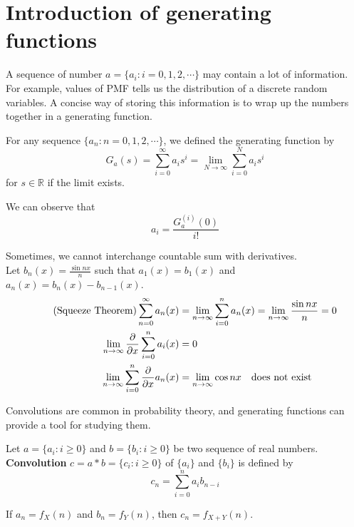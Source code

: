 \documentclass{huhtakm-template-book}
\begin{document}
\section{Introduction of generating functions}
A sequence of number $a=\{a_{i}:i=0,1,2,\cdots\}$ may contain a lot of information. For example, values of PMF tells us the distribution of a discrete random variables. A concise way of storing this information is to wrap up the numbers together in a generating function. 
\begin{defn}
	For any sequence $\{a_{n}:n=0,1,2,\cdots\}$, we defined the generating function by
	\begin{equation*}
		G_{a}(s)=\sum_{i=0}^{\infty}a_{i}s^{i}=\lim_{N\to\infty}\sum_{i=0}^{N}a_{i}s^{i}
	\end{equation*}
	for $s\in\mathbb{R}$ if the limit exists. 
\end{defn}
\begin{rem}
	We can observe that
	\begin{equation*}
		a_{i}=\frac{G_{a}^{(i)}(0)}{i!}
	\end{equation*}
\end{rem}
\begin{eg}
	Sometimes, we cannot interchange countable sum with derivatives.\\
	Let $b_{n}(x)=\frac{\sin{nx}}{n}$ such that $a_{1}(x)=b_{1}(x)$ and $a_{n}(x)=b_{n}(x)-b_{n-1}(x)$.
	\begin{align*}
		\tag{Squeeze Theorem}
		\sum_{n=0}^{\infty}a_{n}(x)&=\lim_{n\to\infty}\sum_{i=0}^{n}a_{n}(x)=\lim_{n\to\infty}\frac{\sin{nx}}{n}=0\\
		\lim_{n\to\infty}\pdv*{\sum_{i=0}^{n}a_{i}(x)}{x}&=0\\
		\lim_{n\to\infty}\sum_{i=0}^{n}\pdv*{a_{n}(x)}{x}&=\lim_{n\to\infty}\cos{nx}\quad \text{does not exist}
	\end{align*}
\end{eg}
Convolutions are common in probability theory, and generating functions can provide a tool for studying them.
\begin{defn}
	Let $a=\{a_{i}:i\geq 0\}$ and $b=\{b_{i}:i\geq 0\}$ be two sequence of real numbers. \textbf{Convolution} $c=a*b=\{c_{i}:i\geq 0\}$ of $\{a_{i}\}$ and $\{b_{i}\}$ is defined by
	\begin{equation*}
		c_{n}=\sum_{i=0}^{n}a_{i}b_{n-i}
	\end{equation*}
\end{defn}
\begin{eg}
	If $a_{n}=f_{X}(n)$ and $b_{n}=f_{Y}(n)$, then $c_{n}=f_{X+Y}(n)$.
\end{eg}
\end{document}
